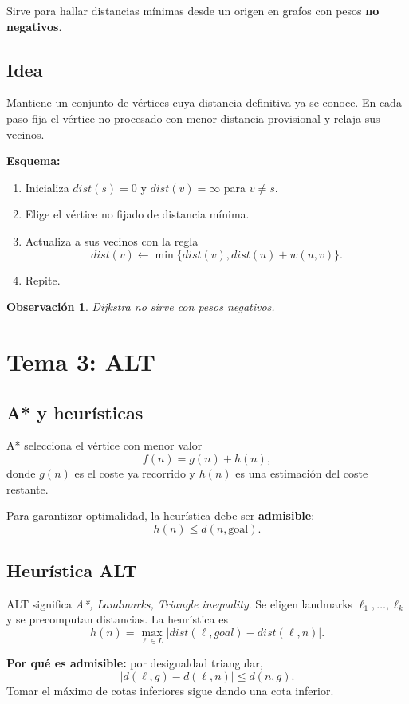\documentclass[11pt,a4paper]{article}
\newtheorem*{obs}{Observación}
\begin{document}
Sirve para hallar distancias mínimas desde un origen en grafos con pesos \textbf{no negativos}.

\subsection*{Idea}
Mantiene un conjunto de vértices cuya distancia definitiva ya se conoce. En cada paso fija el vértice no procesado con menor distancia provisional y relaja sus vecinos.

\textbf{Esquema:}
\begin{enumerate}
    \item Inicializa $dist(s)=0$ y $dist(v)=\infty$ para $v\neq s$.
    \item Elige el vértice no fijado de distancia mínima.
    \item Actualiza a sus vecinos con la regla
    \[
    dist(v)\leftarrow \min\{dist(v),dist(u)+w(u,v)\}.
    \]
    \item Repite.
\end{enumerate}

\begin{obs}
Dijkstra no sirve con pesos negativos.
\end{obs}

\section{Tema 3: ALT}

\subsection{A* y heurísticas}
A* selecciona el vértice con menor valor
\[
f(n)=g(n)+h(n),
\]
donde $g(n)$ es el coste ya recorrido y $h(n)$ es una estimación del coste restante.

Para garantizar optimalidad, la heurística debe ser \textbf{admisible}:
\[
h(n)\le d(n,\text{goal}).
\]

\subsection{Heurística ALT}
ALT significa \textit{A*, Landmarks, Triangle inequality}. Se eligen landmarks $\ell_1,\dots,\ell_k$ y se precomputan distancias. La heurística es
\[
h(n)=\max_{\ell\in L} \bigl|dist(\ell,goal)-dist(\ell,n)\bigr|.
\]

\textbf{Por qué es admisible:} por desigualdad triangular,
\[
|d(\ell,g)-d(\ell,n)|\le d(n,g).
\]
Tomar el máximo de cotas inferiores sigue dando una cota inferior.
\end{document}
